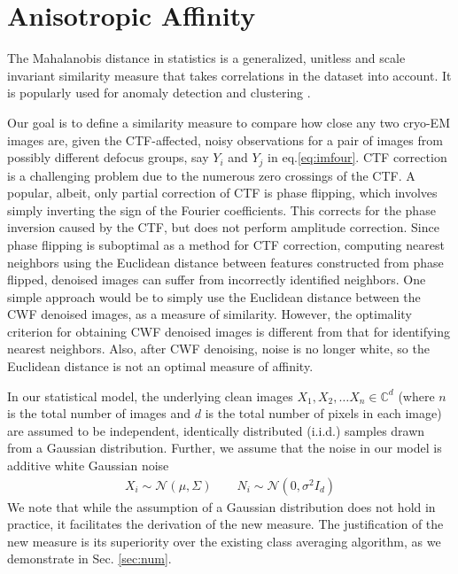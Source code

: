 \documentclass{article}
\begin{document}
\section{Anisotropic Affinity}
The Mahalanobis distance in statistics \cite{mah} is a generalized, unitless and scale invariant similarity measure that takes correlations in the dataset into account. It is popularly used for anomaly detection and clustering \cite{mahclust1, mahclust2}.
 
Our goal is to define a similarity measure to compare how close any two cryo-EM images are, given the CTF-affected, noisy observations for a pair of images from possibly different defocus groups, say $Y_i$ and $Y_j$ in eq.\ref{eq:imfour}.
CTF correction is a challenging problem due to the numerous zero crossings of the CTF. A popular, albeit, only partial correction of CTF is phase flipping, which involves simply inverting the sign of the Fourier coefficients. This corrects for the phase inversion caused by the CTF, but does not perform amplitude correction. Since phase flipping is suboptimal as a method for CTF correction, computing nearest neighbors using the Euclidean distance between features constructed from phase flipped, denoised images can suffer from incorrectly identified neighbors. One simple approach would be to simply use the Euclidean distance between the CWF denoised images, as a measure of similarity. However, the optimality criterion for obtaining CWF denoised images is different from that for identifying nearest neighbors. Also, after CWF denoising, noise is no longer white, so the Euclidean distance is not an optimal measure of affinity.  

In our statistical model, the underlying clean images $X_1, X_2, \ldots X_n \in \mathbb{C}^{d}$ (where $n$ is the total number of images and $d$ is the total number of pixels in each image) are assumed to be independent, identically distributed (i.i.d.) samples drawn from a Gaussian distribution. Further, we assume that the noise in our model is additive white Gaussian noise 
\begin{eqnarray} 
X_i  \sim \mathcal{N}( {\mu},\Sigma) \nonumber \quad \quad
N_i  \sim \mathcal{N}(0,{\sigma}^2 I_d )
\end{eqnarray}
We note that while the assumption of a Gaussian distribution does not hold in practice, it facilitates the derivation of the new measure. The justification of the new measure is its superiority over the existing class averaging algorithm, as we demonstrate in Sec. \ref{sec:num}.
\end{document}
